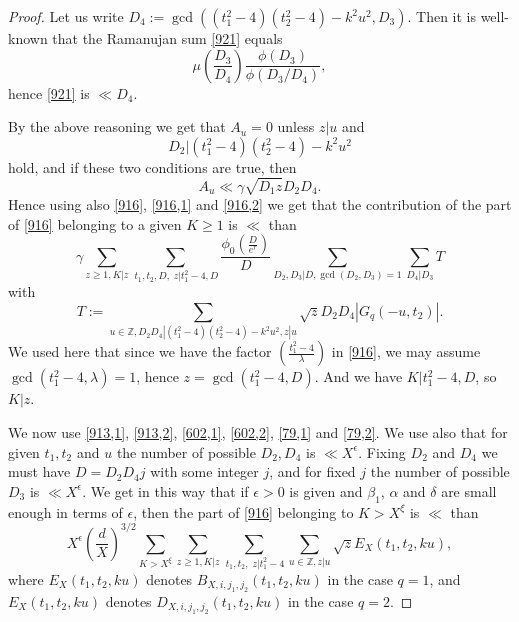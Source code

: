 \documentclass[12pt]{amsart}
\theoremstyle{definition}
\numberwithin{equation}{section}
\begin{document}
\begin{proof}
Let us write $D_4:=\gcd\left(\left(t_1^2-4\right)\left(t_2^2-4\right
)-k^2u^2,D_3\right)$. Then it
is well-known that the Ramanujan sum \eqref{921} equals
\begin{equation}\mu\left(\frac {D_3}{D_4}\right)\frac {\phi\left(
D_3\right)}{\phi\left(D_3/D_4\right)},\label{959}\end{equation}
hence \eqref{921} is $\ll D_4$.

By the above reasoning we get that $A_u=0$ unless $z|u$ and
\[D_2|\left(t_1^2-4\right)\left(t_2^2-4\right)-k^2u^2\]
hold, and if these two conditions are true, then
\[A_u\ll\gamma\sqrt {D_1z}D_2D_4.\]
Hence using also \eqref{916}, \eqref{916,1} and \eqref{916,2}
we get that the contribution of the part of \eqref{916}
belonging to a given $K\ge 1$ is $\ll$ than
\begin{equation}\gamma\sum_{z\ge 1,K|z}\sum_{\,t_1,t_2,D,\;z|t_1^
2-4,D}\frac {\phi_0\left(\frac D{e^r}\right)}D\sum_{D_2,D_3|D,\gcd\left
(D_2,D_3\right)=1}\sum_{D_4|D_3}T\label{1000}\end{equation}
with
\[T:=\sum_{u\in\mathbb{Z},D_2D_4|\left(t_1^2-4\right)\left(t_2^2-
4\right)-k^2u^2,z|u}\sqrt {z}D_2D_4\left|G_q\left(-u,t_2\right)\right
|.\]
We used here that since we have the factor $\left(\frac {t_1^2-4}{
\lambda}\right)$ in
\eqref{916}, we may assume $\gcd\left(t_1^2-4,\lambda\right)=1$, hence
$z=\gcd\left(t_1^2-4,D\right)$. And we have $K|t_1^2-4,D$, so $K|
z$.

We now use \eqref{913,1}, \eqref{913,2}, \eqref{602,1},
\eqref{602,2}, \eqref{79,1} and \eqref{79,2}. We use also
that for given $t_1,t_2$ and $u$ the number of possible $D_2,D_4$
is $\ll X^{\epsilon}$. Fixing $D_2$ and $D_4$ we must have $D=D_2
D_4j$
with some integer $j$, and for fixed $j$ the number of
possible $D_3$ is $\ll X^{\epsilon}$. We get in this way that if $
\epsilon >0$ is
given and $\beta_1$, $\alpha$ and $\delta$ are small enough in terms of $
\epsilon$,
then the part of \eqref{916} belonging to $K>X^{\xi}$ is $\ll$ than
\begin{equation}X^{\epsilon}\left(\frac dX\right)^{3/2}\sum_{K>X^{
\xi}}\sum_{z\ge 1,K|z}\sum_{\,t_1,t_2,\;z|t_1^2-4}\sum_{u\in\mathbb{
Z},z|u}\sqrt {z}E_X\left(t_1,t_2,ku\right),\label{1001}\end{equation}
where $E_X\left(t_1,t_2,ku\right)$ denotes $B_{X,i,j_1,j_2}\left(
t_1,t_2,ku\right)$ in the case $q=1$, and
$E_X\left(t_1,t_2,ku\right)$ denotes $D_{X,i,j_1,j_2}\left(t_1,t_
2,ku\right)$ in the case $q=2$.


\end{proof}
\end{document}
